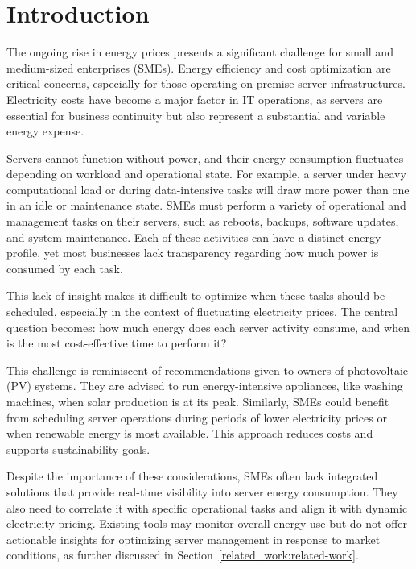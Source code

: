 
\section{Introduction}
\label{introduction:introduction}
The ongoing rise in energy prices presents a significant challenge for small and medium-sized enterprises (SMEs). Energy efficiency and cost optimization are critical concerns, especially for those operating on-premise server infrastructures. Electricity costs have become a major factor in IT operations, as servers are essential for business continuity but also represent a substantial and variable energy expense.

Servers cannot function without power, and their energy consumption fluctuates depending on workload and operational state. For example, a server under heavy computational load or during data-intensive tasks will draw more power than one in an idle or maintenance state. SMEs must perform a variety of operational and management tasks on their servers, such as reboots, backups, software updates, and system maintenance. Each of these activities can have a distinct energy profile, yet most businesses lack transparency regarding how much power is consumed by each task.

This lack of insight makes it difficult to optimize when these tasks should be scheduled, especially in the context of fluctuating electricity prices. The central question becomes: how much energy does each server activity consume, and when is the most cost-effective time to perform it?

This challenge is reminiscent of recommendations given to owners of photovoltaic (PV) systems. They are advised to run energy-intensive appliances, like washing machines, when solar production is at its peak. Similarly, SMEs could benefit from scheduling server operations during periods of lower electricity prices or when renewable energy is most available. This approach reduces costs and supports sustainability goals.

Despite the importance of these considerations, SMEs often lack integrated solutions that provide real-time visibility into server energy consumption. They also need to correlate it with specific operational tasks and align it with dynamic electricity pricing. Existing tools may monitor overall energy use but do not offer actionable insights for optimizing server management in response to market conditions, as further discussed in Section~\ref{related_work:related-work}.

